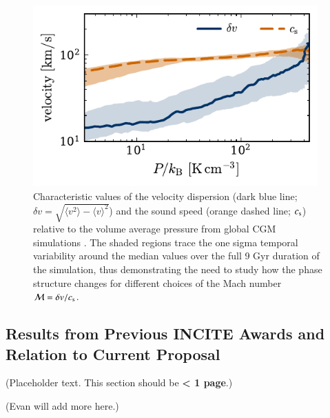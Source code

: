 \documentclass[11pt,letterpaper,english]{article}
\begin{document}
\begin{figure}[h]
    \centering
    \begin{minipage}{0.6\textwidth}
        \includegraphics[width=0.975\textwidth]{../figures/velocity_P.pdf} 
    \end{minipage}\hfill
    \begin{minipage}{0.4\textwidth}
        \centering
\caption{Characteristic values of the velocity dispersion (dark blue line; $\delta v = \sqrt{\langle v^2 \rangle - \langle v \rangle^2}$) and the sound speed (orange dashed line; $c_{\rm s}$) relative to the volume average pressure from global CGM simulations \cite{Fielding17}. The shaded regions trace the one sigma temporal variability around the median values over the full 9 Gyr duration of the simulation, thus demonstrating the need to study how the phase structure changes for different choices of the Mach number $\mathcal{M} = \delta v /  c_{\rm s}$. \label{fig:velocities}} 
\end{minipage}
\end{figure}



\vspace{-.25in}
\subsection{Results from Previous INCITE Awards and Relation to Current Proposal}
\vspace{-.2in}

(Placeholder text. This section should be {\bf < 1 page}.)

(Evan will add more here.)
\end{document}
